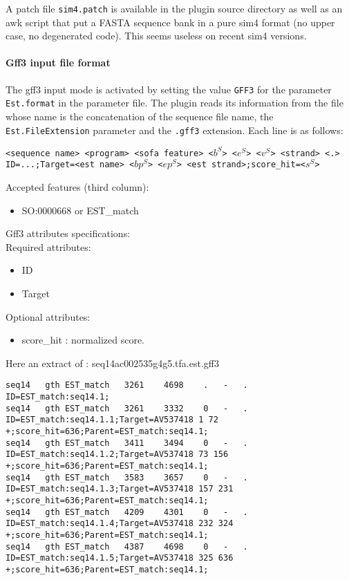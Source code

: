 A patch file \texttt{sim4.patch} is available in the plugin source
directory as well as an awk script that put a FASTA sequence bank in a
pure sim4 format (no upper case, no degenerated code). This seems
useless on recent sim4 versions.

\paragraph{Gff3 input file format}

The gff3 input mode is activated by setting the value \texttt{GFF3}
for the parameter \texttt{Est.format} in the parameter file. The
plugin reads its information from the file whose name is the concatenation
of the sequence file name, the \texttt{Est.FileExtension} parameter 
and the \texttt{.gff3} extension. Each line is as follows:


\texttt{<sequence name> <program> <sofa feature> <$b^S$> <$e^S$> <$v^S$> 
<strand> <.> \\
ID=...;Target=<est name> <$bp^S$> <$ep^S$> <est strand>;score\_hit=<$s^S$>}

Accepted features (third column):
\begin{itemize}
\item  SO:0000668 or EST\_match
\end{itemize}


Gff3 attributes specifications:\\
Required attributes:
	\begin{itemize}
	\item ID
	\item Target
	\end{itemize}

Optional attributes:
	\begin{itemize}
	\item score\_hit :  normalized score.
	\end{itemize}


Here an extract of : seq14ac002535g4g5.tfa.est.gff3
\begin{Verbatim}[fontsize=\tiny]
seq14	gth	EST_match	3261	4698	.	-	.	ID=EST_match:seq14.1;
seq14	gth	EST_match	3261	3332	0	-	.	ID=EST_match:seq14.1.1;Target=AV537418 1 72 +;score_hit=636;Parent=EST_match:seq14.1;
seq14	gth	EST_match	3411	3494	0	-	.	ID=EST_match:seq14.1.2;Target=AV537418 73 156 +;score_hit=636;Parent=EST_match:seq14.1;
seq14	gth	EST_match	3583	3657	0	-	.	ID=EST_match:seq14.1.3;Target=AV537418 157 231 +;score_hit=636;Parent=EST_match:seq14.1;
seq14	gth	EST_match	4209	4301	0	-	.	ID=EST_match:seq14.1.4;Target=AV537418 232 324 +;score_hit=636;Parent=EST_match:seq14.1;
seq14	gth	EST_match	4387	4698	0	-	.	ID=EST_match:seq14.1.5;Target=AV537418 325 636 +;score_hit=636;Parent=EST_match:seq14.1;
\end{Verbatim}


